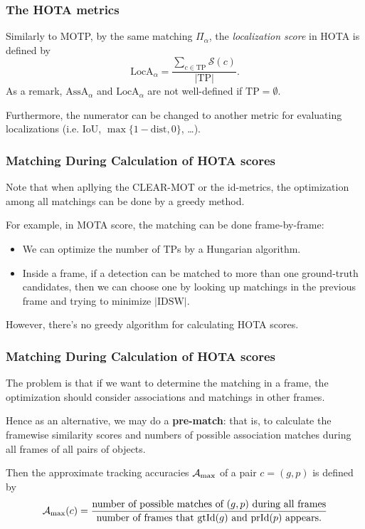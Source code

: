 \documentclass[slidetop, mathserif]{beamer}
\begin{document}
\begin{frame}
	\frametitle{The HOTA metrics}
		
	Similarly to MOTP, by the same matching $\Pi_\alpha$,
	the \emph{\color{red} localization score} in HOTA is defined by
	\[
		\text{LocA}_\alpha = \dfrac{\sum_{c\in\text{TP}} \mathcal S(c)}{|\text{TP}|}.
	\]
	As a remark, $\text{AssA}_\alpha$ and $\text{LocA}_\alpha$ are not well-defined
	if $\text{TP} = \emptyset$.

	\quad

	Furthermore, the numerator can be changed to another metric for evaluating localizations
	(i.e. IoU, $\max\{1-\text{dist},0\}$, \ldots).
		
\end{frame}

\begin{frame}
	\frametitle{Matching During Calculation of HOTA scores}

	Note that when apllying the CLEAR-MOT or the id-metrics,
	the optimization among all matchings can be done by a greedy method.

	\vspace{5pt}

	For example, in MOTA score, the matching can be done frame-by-frame:
	\begin{itemize}
	\item We can optimize the number of TPs by a Hungarian algorithm.
	\item Inside a frame, if a detection can be matched to more than one
		ground-truth candidates, then we can choose one by looking up
		matchings in the previous frame and trying to minimize $|\text{IDSW}|$.
	\end{itemize}

	However, there's no greedy algorithm for calculating HOTA scores.
	
\end{frame}

\begin{frame}
	\frametitle{Matching During Calculation of HOTA scores}

	The problem is that if we want to determine the matching in a frame,
	the optimization should consider associations and matchings in other frames.

	\vspace{5pt}

	Hence as an alternative, we may do a {\bf pre-match}: that is, to calculate
	the framewise similarity scores and numbers of possible 
	association matches during all frames of all pairs of objects.

	\vspace{5pt}

	Then the approximate tracking accuracies $\mathcal A_{\rm max}$
	of a pair $c=(g,p)$ is defined by
	\[
		\mathcal A_{\rm max}(c)
		= \dfrac{\text{number of possible matches of $(g,p)$ during all frames}}{
			\text{number of frames that gtId($g$) and prId($p$) appears}.
		}
	\]

\end{frame}
\end{document}
